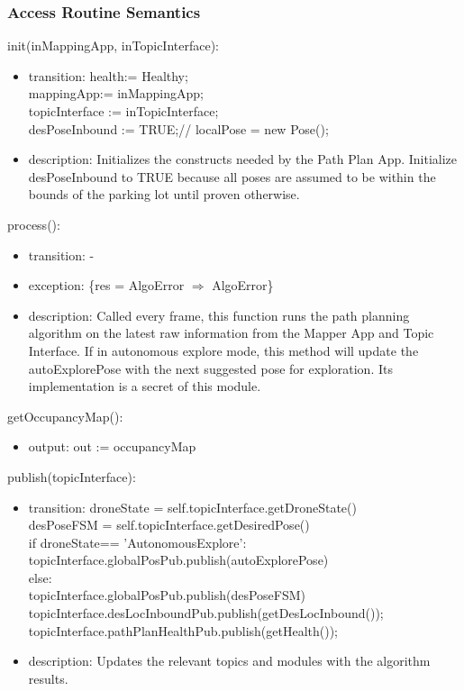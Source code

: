 \documentclass[12pt, titlepage]{article}
\begin{document}
\subsubsection{Access Routine Semantics}
\noindent init(inMappingApp, inTopicInterface):
\begin{itemize}
\item transition: health:= Healthy; \\ mappingApp:= inMappingApp; \\ topicInterface := inTopicInterface; \\ desPoseInbound := TRUE;//
localPose = new Pose(); 
\item description: Initializes the constructs needed by the Path Plan App. Initialize desPoseInbound to TRUE because all poses are assumed to be within the bounds of the parking lot until proven otherwise.
\end{itemize}
\noindent process():
\begin{itemize}
\item transition: -
\item exception: \{res = AlgoError $\Rightarrow$ AlgoError\}
\item description: Called every frame, this function runs the path planning algorithm on the latest raw information from the Mapper App and Topic Interface. If in autonomous explore mode, this method will update the autoExplorePose with the next suggested pose for exploration. Its implementation is a secret of this module.
\end{itemize}
\noindent getOccupancyMap():
\begin{itemize}
\item output: out := occupancyMap
\end{itemize}
\noindent publish(topicInterface):
\begin{itemize}
\item transition: 
droneState = self.topicInterface.getDroneState() \\
desPoseFSM = self.topicInterface.getDesiredPose()\\
if  droneState== 'AutonomousExplore': \\ topicInterface.globalPosPub.publish(autoExplorePose) \\
else: \\
topicInterface.globalPosPub.publish(desPoseFSM) \\
topicInterface.desLocInboundPub.publish(getDesLocInbound()); \\
topicInterface.pathPlanHealthPub.publish(getHealth()); \\
\item description: Updates the relevant topics and modules with the algorithm results.
\end{itemize}
\end{document}
